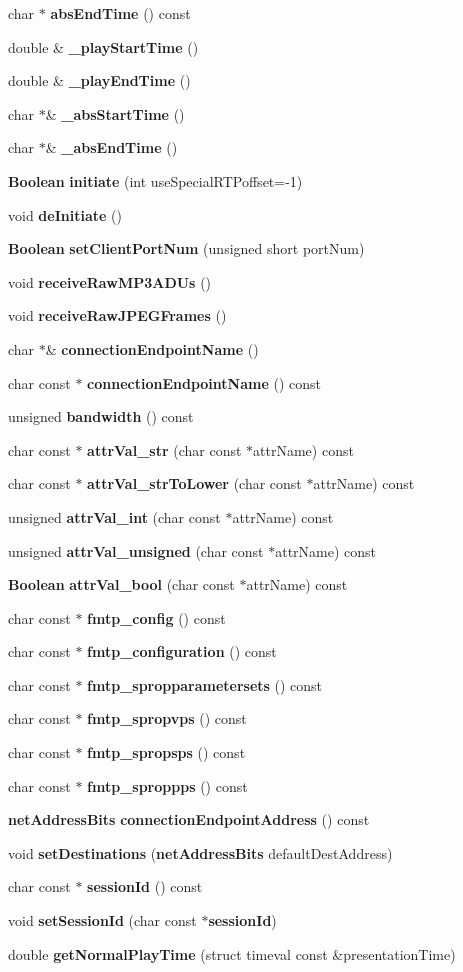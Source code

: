 \begin{DoxyCompactItemize}
char $\ast$ {\bf abs\+End\+Time} () const 
\item 
double \& {\bf \+\_\+play\+Start\+Time} ()
\item 
double \& {\bf \+\_\+play\+End\+Time} ()
\item 
char $\ast$\& {\bf \+\_\+abs\+Start\+Time} ()
\item 
char $\ast$\& {\bf \+\_\+abs\+End\+Time} ()
\item 
{\bf Boolean} {\bf initiate} (int use\+Special\+R\+T\+Poffset=-\/1)
\item 
void {\bf de\+Initiate} ()
\item 
{\bf Boolean} {\bf set\+Client\+Port\+Num} (unsigned short port\+Num)
\item 
void {\bf receive\+Raw\+M\+P3\+A\+D\+Us} ()
\item 
void {\bf receive\+Raw\+J\+P\+E\+G\+Frames} ()
\item 
char $\ast$\& {\bf connection\+Endpoint\+Name} ()
\item 
char const $\ast$ {\bf connection\+Endpoint\+Name} () const 
\item 
unsigned {\bf bandwidth} () const 
\item 
char const $\ast$ {\bf attr\+Val\+\_\+str} (char const $\ast$attr\+Name) const 
\item 
char const $\ast$ {\bf attr\+Val\+\_\+str\+To\+Lower} (char const $\ast$attr\+Name) const 
\item 
unsigned {\bf attr\+Val\+\_\+int} (char const $\ast$attr\+Name) const 
\item 
unsigned {\bf attr\+Val\+\_\+unsigned} (char const $\ast$attr\+Name) const 
\item 
{\bf Boolean} {\bf attr\+Val\+\_\+bool} (char const $\ast$attr\+Name) const 
\item 
char const $\ast$ {\bf fmtp\+\_\+config} () const 
\item 
char const $\ast$ {\bf fmtp\+\_\+configuration} () const 
\item 
char const $\ast$ {\bf fmtp\+\_\+spropparametersets} () const 
\item 
char const $\ast$ {\bf fmtp\+\_\+spropvps} () const 
\item 
char const $\ast$ {\bf fmtp\+\_\+spropsps} () const 
\item 
char const $\ast$ {\bf fmtp\+\_\+sproppps} () const 
\item 
{\bf net\+Address\+Bits} {\bf connection\+Endpoint\+Address} () const 
\item 
void {\bf set\+Destinations} ({\bf net\+Address\+Bits} default\+Dest\+Address)
\item 
char const $\ast$ {\bf session\+Id} () const 
\item 
void {\bf set\+Session\+Id} (char const $\ast${\bf session\+Id})
\item 
double {\bf get\+Normal\+Play\+Time} (struct timeval const \&presentation\+Time)
\end{DoxyCompactItemize}
